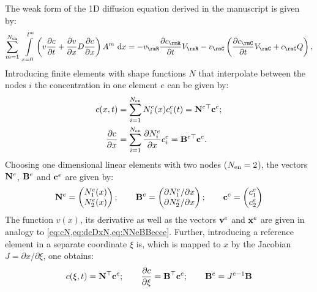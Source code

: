 \documentclass{article}
\begin{document}
  The weak form of the 1D diffusion equation derived in the manuscript is given by:
  \begin{equation}
    \sumch \ \intlm \left( v \dcDt + \dvDx D \dcDx \right) \Am \ \rmd x= - v_\rmR \frac{\partial c_\rmR}{\partial t} V_\rmR - v_\rmC \left( \frac{\partial c_\rmC}{\partial t} V_\rmC + c_\rmC Q\right), 
    \label{eq:weakForm}
  \end{equation}  
  Introducing finite elements with shape functions $N$ that interpolate between the nodes $i$ the concentration in one element $e$ can be given by:
  \begin{align}
    c(x,t) &= \sum_{i=1}^{N_{\rm en}} N_i^e(x) c_i^e(t) = {{\bf{N}}}^{e \top} {\bf{c}}^e \label{eq:cN};\\
    \frac{\partial c}{\partial x} &= \sum_{i=1}^{N_{\rm en}} \frac{\partial N_i^e}{\partial x} c_i^e= {{\bf{B}}}^{e \top} {\bf{c}}^e.
    \label{eq:dcDxN}
  \end{align}
  Choosing one dimensional linear elements with two nodes ($N_{\rm en}=2$), the vectors ${\bf{N}}^e$, ${\bf{B}}^e$ and ${\bf{c}}^e$ are given by:
  \begin{equation}
    {\bf{N}}^e = \begin{pmatrix} N_1^e(x) \\ N_2^e(x) \end{pmatrix}; \qquad 
    {\bf{B}}^e = \begin{pmatrix} \partial N_1^e / \partial x \\ \partial N_2^e / \partial x \end{pmatrix}; \qquad 
    {\bf{c}}^e = \begin{pmatrix} c_1^e \\ c_2^e \end{pmatrix}
    \label{eq:NNeBBecce}
  \end{equation}
  The function $v(x)$, its derivative as well as the vectors ${\bf{v}}^e$ and ${\bf{x}}^e$ are given in analogy to \cref{eq:cN,eq:dcDxN,eq:NNeBBecce}. Further, introducing a reference element in a separate coordinate $\xi$ is, which is mapped to $x$ by the Jacobian \mbox{$J=\partial x / \partial \xi$}, one obtains:
  \begin{equation}
    c(\xi,t) = {\bf{N}}^{\top} {\bf{c}}^e; \qquad \frac{\partial c}{\partial \xi} = {\bf{B}}^{\top} {\bf{c}}^e; \qquad {\bf{B}}^e = J^{e-1} {\bf{B}}
  \end{equation}
\end{document}
